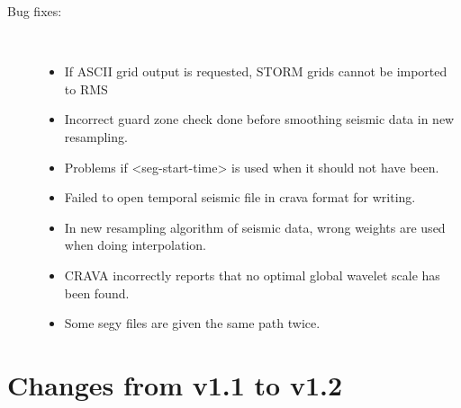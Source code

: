 \begin{description}
\item [Bug fixes:] \mbox{ }
  \begin{itemize}
  \item If ASCII grid output is requested, STORM grids cannot be imported to RMS 
    \item Incorrect guard zone check done before smoothing seismic data in new resampling. 
    \item Problems if <seg-start-time> is used when it should not have been. 
    \item Failed to open temporal seismic file in crava format for writing. 
    \item In new resampling algorithm of seismic data, wrong weights are used when doing interpolation. 
    \item CRAVA incorrectly reports that no optimal global wavelet scale has been found. 
    \item Some segy files are given the same path twice. 
  \end{itemize}
\end{description}

\section{Changes from v1.1 to v1.2}

